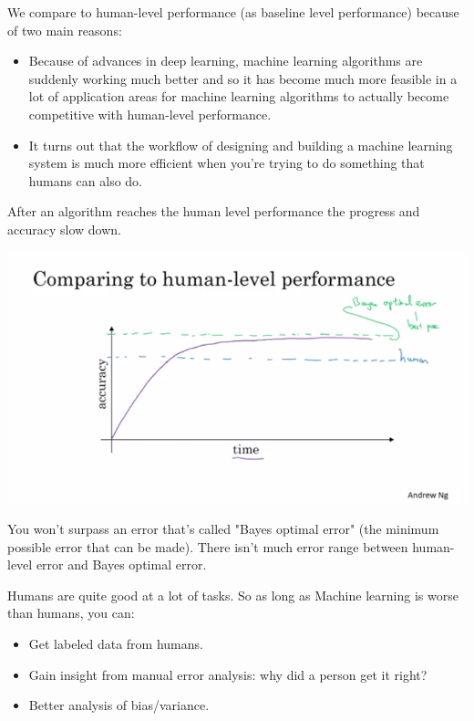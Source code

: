 \documentclass{article}
\begin{document}
\noindent We compare to human-level performance (as baseline level performance) because of two main reasons:

\begin{itemize}
    \item Because of advances in deep learning, machine learning algorithms are suddenly working much better and so it has become much more feasible in a lot of application areas for machine learning algorithms to actually become competitive with human-level performance.
    \item It turns out that the workflow of designing and building a machine learning system is much more efficient when you're trying to do something that humans can also do.
\end{itemize}

\noindent After an algorithm reaches the human level performance the progress and accuracy slow down.

\begin{center}
\includegraphics[scale=0.6]{./images/human_level_performance.png}
\end{center}

\noindent You won't surpass an error that's called "Bayes optimal error" (the minimum possible error that can be made). There isn't much error range between human-level error and Bayes optimal error.

\bigskip

\noindent Humans are quite good at a lot of tasks. So as long as Machine learning is worse than humans, you can:

\begin{itemize}
    \item Get labeled data from humans.
    \item Gain insight from manual error analysis: why did a person get it right?
    \item Better analysis of bias/variance.
\end{itemize}
\end{document}
